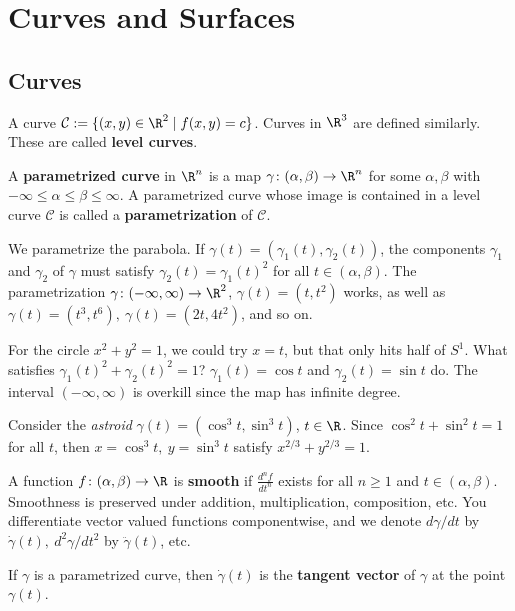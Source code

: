 \section{Curves and Surfaces}
\subsection{Curves}
A curve $\mathcal{C} := \{(x,y)\in \R^2  \mid f(x,y)=c\} $. Curves in $\R^3$ are defined similarly. These are called \textbf{level curves}. 
\begin{definition}[]
    A \textbf{parametrized curve} in $\R^n $ is a map $\gamma \colon (\alpha ,\beta ) \to \R^n $ for some $\alpha ,\beta $ with $-\infty\leq \alpha  \leq \beta  \leq \infty$. A parametrized curve whose image is contained in a level curve $\mathcal{C} $ is called a \textbf{parametrization} of $\mathcal{C} $.
\end{definition}
\begin{example}
    We parametrize the parabola. If $\gamma(t)=(\gamma_1(t),\gamma_2(t))$, the components $\gamma_1$ and $\gamma_2$ of $\gamma$ must satisfy $\gamma_2(t)=\gamma_1(t)^2$ for all $t\in (\alpha ,\beta )$. The parametrization $\gamma \colon (-\infty,\infty) \to \R^2$, $\gamma(t)=(t,t^2)$ works, as well as $\gamma(t)=(t^3,t^6), \ \gamma(t)=(2t,4t^2)$, and so on. 

    For the circle $x^2+y^2=1$, we could try $x=t$, but that only hits half of $S^1 $. What satisfies $\gamma_1(t)^2+\gamma_2(t)^2=1$? $\gamma_1(t)=\cos t$ and $\gamma_2(t)= \sin t$ do. The interval $(-\infty,\infty)$ is overkill since the map has infinite degree.
\end{example}
\begin{example}
    Consider the \emph{astroid} $\gamma(t)=(\cos ^3 t, \sin ^3 t)$, $t\in \R$. Since $\cos ^2t + \sin ^2 t=1$ for all $t$, then $x = \cos ^3 t, \ y= \sin ^3 t$ satisfy $x ^{2 /3}+ y ^{2 /3}=1$.
\end{example}
A function $f \colon (\alpha ,\beta ) \to \R$ is \textbf{smooth} if $\frac{d^n f}{dt ^n  }$ exists for all $n\geq 1$ and $t \in (\alpha ,\beta )$. Smoothness is preserved under addition, multiplication, composition, etc. You differentiate vector valued functions componentwise, and we denote $d\gamma / dt$ by $\dot \gamma(t), \ d^2 \gamma / dt^2$ by $\ddot \gamma(t)$, etc. 
\begin{definition}[]
    If $\gamma$ is a parametrized curve, then $\dot \gamma(t)$ is the \textbf{tangent vector} of $\gamma$ at the point $\gamma(t)$.
\end{definition}
